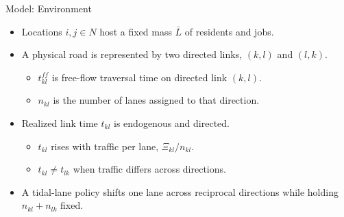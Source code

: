 \documentclass[11pt,aspectratio=169]{beamer}
\begin{document}
\begin{frame}{Model: Environment}
\begin{itemize}\small
  \item Locations $i,j\in N$ host a fixed mass $\bar L$ of residents and jobs.
  \item A physical road is represented by two directed links, $(k,l)$ and $(l,k)$.
  \begin{itemize}\footnotesize
    \item $t_{kl}^{ff}$ is free-flow traversal time on directed link $(k,l)$.
    \item $n_{kl}$ is the number of lanes assigned to that direction.
  \end{itemize}
  \item Realized link time $t_{kl}$ is endogenous and directed.
  \begin{itemize}\footnotesize
    \item $t_{kl}$ rises with traffic per lane, $\Xi_{kl}/n_{kl}$.
    \item $t_{kl}\neq t_{lk}$ when traffic differs across directions.
  \end{itemize}
  \item A tidal-lane policy shifts one lane across reciprocal directions while holding $n_{kl}+n_{lk}$ fixed.
\end{itemize}
\end{frame}
\end{document}
